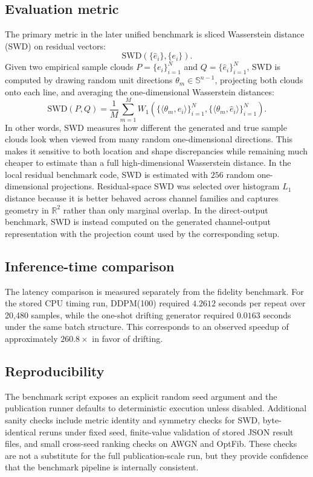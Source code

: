 \subsection{Evaluation metric}
The primary metric in the later unified benchmark is sliced Wasserstein distance (SWD) on residual vectors:
\begin{equation}
\mathrm{SWD}\!\left(\{\hat{e}_i\}, \{e_i\}\right).
\end{equation}
Given two empirical sample clouds \(P=\{e_i\}_{i=1}^N\) and \(Q=\{\hat e_i\}_{i=1}^N\), SWD is computed by drawing random unit directions \(\theta_m \in \mathbb{S}^{n-1}\), projecting both clouds onto each line, and averaging the one-dimensional Wasserstein distances:
\begin{equation}
\mathrm{SWD}(P,Q)
=
\frac{1}{M}
\sum_{m=1}^M
W_1\!\left(\{\langle \theta_m,e_i\rangle\}_{i=1}^N,\{\langle \theta_m,\hat e_i\rangle\}_{i=1}^N\right).
\end{equation}
In other words, SWD measures how different the generated and true sample clouds look when viewed from many random one-dimensional directions.
This makes it sensitive to both location and shape discrepancies while remaining much cheaper to estimate than a full high-dimensional Wasserstein distance.
In the local residual benchmark code, SWD is estimated with \(256\) random one-dimensional projections.
Residual-space SWD was selected over histogram \(L_1\) distance because it is better behaved across channel families and captures geometry in \(\mathbb{R}^2\) rather than only marginal overlap.
In the direct-output benchmark, SWD is instead computed on the generated channel-output representation with the projection count used by the corresponding setup.

\subsection{Inference-time comparison}
The latency comparison is measured separately from the fidelity benchmark.
For the stored CPU timing run, DDPM(100) required \(4.2612\) seconds per repeat over 20,480 samples, while the one-shot drifting generator required \(0.0163\) seconds under the same batch structure.
This corresponds to an observed speedup of approximately \(260.8\times\) in favor of drifting.

\subsection{Reproducibility}
The benchmark script exposes an explicit random seed argument and the publication runner defaults to deterministic execution unless disabled.
Additional sanity checks include metric identity and symmetry checks for SWD, byte-identical reruns under fixed seed, finite-value validation of stored JSON result files, and small cross-seed ranking checks on AWGN and OptFib.
These checks are not a substitute for the full publication-scale run, but they provide confidence that the benchmark pipeline is internally consistent.
